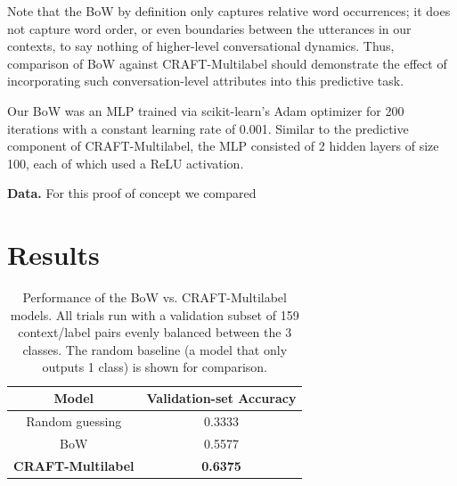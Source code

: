 \documentclass{article}
\begin{document}
Note that the BoW by definition only captures relative word occurrences; it does not capture word order, or even boundaries between the utterances in our contexts, to say nothing of higher-level conversational dynamics. Thus, comparison of BoW against CRAFT-Multilabel should demonstrate the effect of incorporating such conversation-level attributes into this predictive task.

Our BoW was an MLP trained via scikit-learn's Adam optimizer \cite{scikit-learn} for 200 iterations with a constant learning rate of 0.001. Similar to the predictive component of CRAFT-Multilabel, the MLP consisted of 2 hidden layers of size 100, each of which used a ReLU activation.

\textbf{Data.} For this proof of concept we compared 


\section{Results}
\label{sec:results}

\begin{table}[t]
  \centering
  \begin{tabular}{@{}cc@{}}
  \toprule
  \textbf{Model}            & \textbf{Validation-set Accuracy} \\ \midrule
  Random guessing           & 0.3333                           \\
  BoW                       & 0.5577                           \\
  \textbf{CRAFT-Multilabel} & \textbf{0.6375}                  \\ \bottomrule
  \end{tabular}
  \caption{Performance of the BoW vs. CRAFT-Multilabel models. All trials run with a validation subset of 159 context/label pairs evenly balanced between the 3 classes. The random baseline (a model that only outputs 1 class) is shown for comparison.}
  \label{tab:results}
\end{table}
\end{document}
